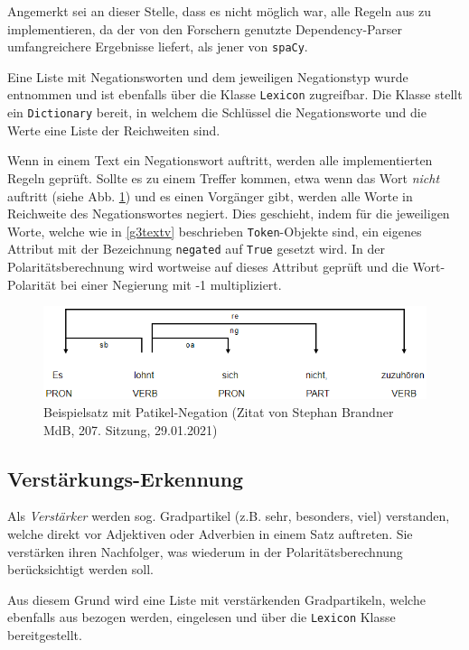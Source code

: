 Angemerkt sei an dieser Stelle, dass es nicht möglich war, alle Regeln aus \cite{g3_wieg} zu implementieren, da der von den Forschern genutzte Dependency-Parser umfangreichere Ergebnisse liefert, als jener von \texttt{spaCy}. 

Eine Liste mit Negationsworten und dem jeweiligen Negationstyp wurde \cite{g3_polcla} entnommen und ist ebenfalls über die Klasse \texttt{Lexicon} zugreifbar. 
Die Klasse stellt ein \texttt{Dictionary} bereit, in welchem die Schlüssel die Negationsworte und die Werte eine Liste der Reichweiten sind. 

Wenn in einem Text ein Negationswort auftritt, werden alle implementierten Regeln geprüft. 
Sollte es zu einem Treffer kommen, etwa wenn das Wort \textit{nicht} auftritt (siehe Abb. \ref{brandner}) und es einen Vorgänger gibt, werden alle Worte in Reichweite des Negationswortes negiert. 
Dies geschieht, indem für die jeweiligen Worte, welche wie in \ref{g3textv} beschrieben \texttt{Token}-Objekte sind, ein eigenes Attribut mit der Bezeichnung \texttt{negated} auf \texttt{True} gesetzt wird. 
In der Polaritätsberechnung wird wortweise auf dieses Attribut geprüft und die Wort-Polarität bei einer Negierung mit -1 multipliziert. 

\begin{figure}[htb]
\centerline{\includegraphics[width=1\textwidth]{chapters/04-Sentiment-Analyse/brandner.png}}
\caption{Beispielsatz mit Patikel-Negation (Zitat von Stephan Brandner MdB, 207. Sitzung, 29.01.2021)}
\label{brandner}
\end{figure}

\subsection{Verstärkungs-Erkennung}
\label{ver-erkennung}
Als \textit{Verstärker} werden sog. Gradpartikel (z.B. sehr, besonders, viel) verstanden, welche direkt vor Adjektiven oder Adverbien in einem Satz auftreten. 
Sie verstärken ihren Nachfolger, was wiederum in der Polaritätsberechnung berücksichtigt werden soll. 

Aus diesem Grund wird eine Liste mit verstärkenden Gradpartikeln, welche ebenfalls aus \cite{g3_polcla} bezogen werden, eingelesen und über die \texttt{Lexicon} Klasse bereitgestellt. 

